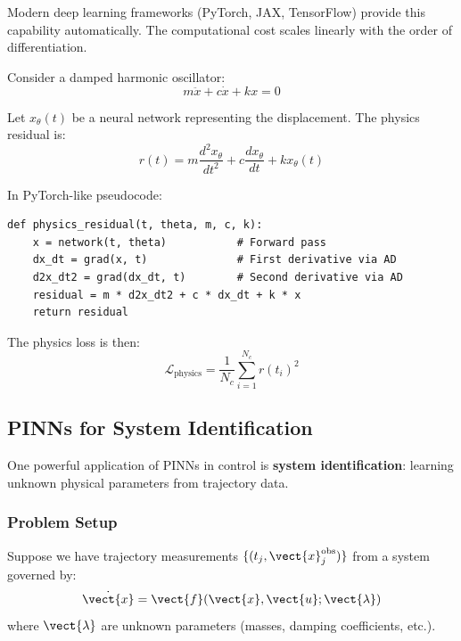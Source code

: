 Modern deep learning frameworks (PyTorch, JAX, TensorFlow) provide this capability automatically. The computational cost scales linearly with the order of differentiation.

\begin{example}
\label{ex:ad_residuals}

Consider a damped harmonic oscillator:
\begin{equation}
m\ddot{x} + c\dot{x} + kx = 0
\end{equation}

Let $x_\theta(t)$ be a neural network representing the displacement. The physics residual is:
\begin{equation}
r(t) = m\frac{d^2 x_\theta}{dt^2} + c\frac{d x_\theta}{dt} + k x_\theta(t)
\end{equation}

In PyTorch-like pseudocode:
\begin{verbatim}
def physics_residual(t, theta, m, c, k):
    x = network(t, theta)           # Forward pass
    dx_dt = grad(x, t)              # First derivative via AD
    d2x_dt2 = grad(dx_dt, t)        # Second derivative via AD
    residual = m * d2x_dt2 + c * dx_dt + k * x
    return residual
\end{verbatim}

The physics loss is then:
\begin{equation}
\mathcal{L}_{\text{physics}} = \frac{1}{N_c} \sum_{i=1}^{N_c} r(t_i)^2
\end{equation}
\end{example}

\subsection{PINNs for System Identification}

One powerful application of PINNs in control is \textbf{system identification}: learning unknown physical parameters from trajectory data.

\subsubsection{Problem Setup}

Suppose we have trajectory measurements $\{(t_j, \vect{x}_j^{\text{obs}})\}$ from a system governed by:
\begin{equation}
\dot{\vect{x}} = \vect{f}(\vect{x}, \vect{u}; \vect{\lambda})
\end{equation}
where $\vect{\lambda}$ are unknown parameters (masses, damping coefficients, etc.).

